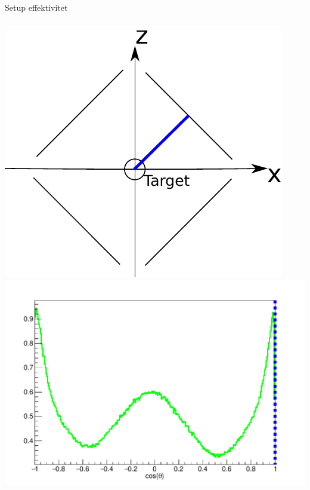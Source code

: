 \begin{frame}{Setup effektivitet}
\begin{columns}
		\begin{overprint}
			\includegraphics[width=\columnwidth]{../figures/showAngles/opstilling_show_angles_1.pdf}
			\includegraphics[width=\columnwidth]{../figures/showAngles/data_1.pdf}

\end{overprint}
\end{columns}
\end{frame}
